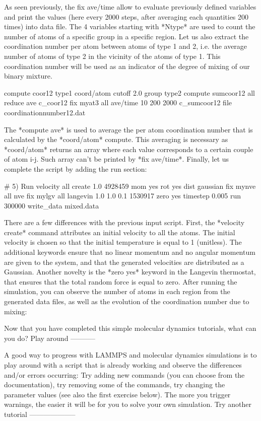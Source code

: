 As seen previously, the fix ave/time
allow to evaluate previously defined variables and print
the values (here every 2000 steps, after averaging each quantities 200 times)
into data file. The 4 variables starting with *Ntype* are used to count
the number of atoms of a specific group in a specific
region. 
Let us also extract the coordination number per atom between atoms 
of type 1 and 2, i.e. the average number of atoms of type 2 in the vicinity 
of the atoms of type 1. This coordination number will be used as an indicator of the 
degree of mixing of our binary mixture. 

\begin{lcverbatim}
compute coor12 type1 coord/atom cutoff 2.0 group type2
compute sumcoor12 all reduce ave c_coor12
fix myat3 all ave/time 10 200 2000 c_sumcoor12 file coordinationnumber12.dat
\end{lcverbatim}

The *compute ave* is used to average the per atom
coordination number that is calculated by the *coord/atom* compute.
This averaging is necessary as *coord/atom* returns an array where each value corresponds 
to a certain couple of atom i-j. Such array can't be printed by *fix ave/time*. 
Finally, let us complete the script by adding the run section:

\begin{lcverbatim}
# 5) Run
velocity all create 1.0 4928459 mom yes rot yes dist gaussian
fix mynve all nve
fix mylgv all langevin 1.0 1.0 0.1 1530917 zero yes
timestep 0.005
run 300000
write_data mixed.data
\end{lcverbatim}

There are a few differences with the
previous input script. First, the *velocity create*
command attributes an initial velocity to all the atoms.
The initial velocity is chosen so that the initial
temperature is equal to 1 (unitless). The additional
keywords ensure that no linear momentum and no angular
momentum are given to the system, and that the generated
velocities are distributed as a Gaussian. Another novelty
is the *zero yes* keyword in the Langevin thermostat, that
ensures that the total random force is equal to zero.
After running the simulation, you can observe the number
of atoms in each region from the generated data files, as
well as the evolution of the coordination number due to
mixing:

Now that you have completed this simple molecular dynamics tutorials, what can you do?
Play around
-----------

A good way to progress with LAMMPS and molecular dynamics
simulations is to play around with a script that is already
working and observe the differences and/or errors occurring:
Try adding new commands (you can choose from the documentation),
try removing some of the commands, try changing the parameter values
(see also the first exercise below).
The more you trigger warnings, the easier it will be for you to solve your
own simulation.
Try another tutorial
--------------------


